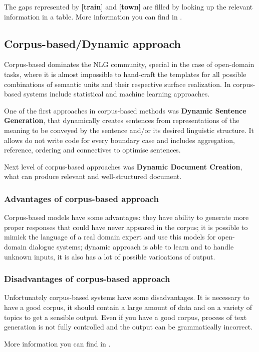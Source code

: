 The gaps represented by \textbf{[train]} and \textbf{[town]} are filled by looking up the relevant
information in a table. More information you can find in \cite{applied_nlg}.

\subsection{Corpus-based/Dynamic approach}
Corpus-based dominates the NLG community, special in the case of open-domain tasks, where it is almost impossible to hand-craft the templates for all possible combinations of semantic units and their respective surface realization.
In corpus-based systems include statistical and machine learning approaches. 

One of the first approaches in corpus-based methods was \textbf{Dynamic Sentence Generation}, that dynamically creates sentences from representations of the meaning to be conveyed by the sentence and/or its desired linguistic structure. It allows do not write code for every boundary case and includes aggregation, reference, ordering and connectives to optimise sentences.

Next level of corpus-based approaches was \textbf{Dynamic Document Creation}, what can produce relevant and well-structured document. 

\subsubsection{Advantages of corpus-based approach}
Corpus-based models have some advantages: they have ability to generate more proper responses that could have never appeared in the corpus; it is possible to mimick the language of a real domain expert and use this models for open-domain dialogue systems; dynamic approach is able to learn and to handle unknown inputs, it is also has a lot of possible varioations of output.

\subsubsection{Disadvantages of corpus-based approach}
Unfortunately corpus-based systems have some disadvantages. It is necessary to have a good corpus, it should contain a large amount of data and on a variety of topics to get a sensible output. Even if you have a good corpus, process of text generation is not fully controlled and the output can be grammatically incorrect.

More information you can find in \cite{stochastic_language_generation_ds} \cite{survey_on_ds} \cite{data_driven_nlg}.

